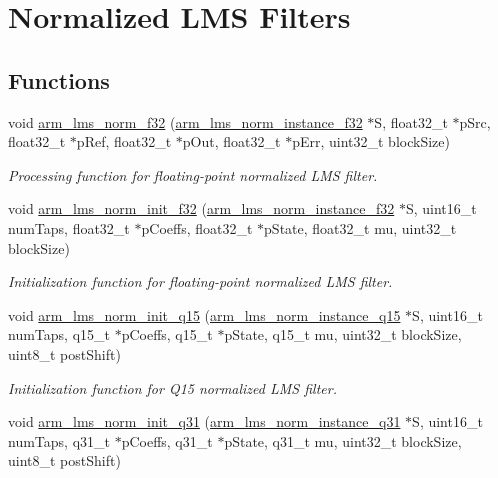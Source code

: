 \hypertarget{group___l_m_s___n_o_r_m}{\section{Normalized L\-M\-S Filters}
\label{group___l_m_s___n_o_r_m}
}
\subsection*{Functions}
\begin{DoxyCompactItemize}
\item 
void \hyperlink{group___l_m_s___n_o_r_m_ga2418c929087c6eba719758eaae3f3300}{arm\-\_\-lms\-\_\-norm\-\_\-f32} (\hyperlink{structarm__lms__norm__instance__f32}{arm\-\_\-lms\-\_\-norm\-\_\-instance\-\_\-f32} $\ast$S, float32\-\_\-t $\ast$p\-Src, float32\-\_\-t $\ast$p\-Ref, float32\-\_\-t $\ast$p\-Out, float32\-\_\-t $\ast$p\-Err, uint32\-\_\-t block\-Size)
\begin{DoxyCompactList}\small\item\em Processing function for floating-\/point normalized L\-M\-S filter. \end{DoxyCompactList}\item 
void \hyperlink{group___l_m_s___n_o_r_m_gac7ccbaea863882056eee815456464670}{arm\-\_\-lms\-\_\-norm\-\_\-init\-\_\-f32} (\hyperlink{structarm__lms__norm__instance__f32}{arm\-\_\-lms\-\_\-norm\-\_\-instance\-\_\-f32} $\ast$S, uint16\-\_\-t num\-Taps, float32\-\_\-t $\ast$p\-Coeffs, float32\-\_\-t $\ast$p\-State, float32\-\_\-t mu, uint32\-\_\-t block\-Size)
\begin{DoxyCompactList}\small\item\em Initialization function for floating-\/point normalized L\-M\-S filter. \end{DoxyCompactList}\item 
void \hyperlink{group___l_m_s___n_o_r_m_ga213ab1ee2e154cc2fa30d667b1994b89}{arm\-\_\-lms\-\_\-norm\-\_\-init\-\_\-q15} (\hyperlink{structarm__lms__norm__instance__q15}{arm\-\_\-lms\-\_\-norm\-\_\-instance\-\_\-q15} $\ast$S, uint16\-\_\-t num\-Taps, q15\-\_\-t $\ast$p\-Coeffs, q15\-\_\-t $\ast$p\-State, q15\-\_\-t mu, uint32\-\_\-t block\-Size, uint8\-\_\-t post\-Shift)
\begin{DoxyCompactList}\small\item\em Initialization function for Q15 normalized L\-M\-S filter. \end{DoxyCompactList}\item 
void \hyperlink{group___l_m_s___n_o_r_m_ga1d9659dbbea4c89a7a9d14d5fc0dd490}{arm\-\_\-lms\-\_\-norm\-\_\-init\-\_\-q31} (\hyperlink{structarm__lms__norm__instance__q31}{arm\-\_\-lms\-\_\-norm\-\_\-instance\-\_\-q31} $\ast$S, uint16\-\_\-t num\-Taps, q31\-\_\-t $\ast$p\-Coeffs, q31\-\_\-t $\ast$p\-State, q31\-\_\-t mu, uint32\-\_\-t block\-Size, uint8\-\_\-t post\-Shift)

\end{DoxyCompactItemize}
